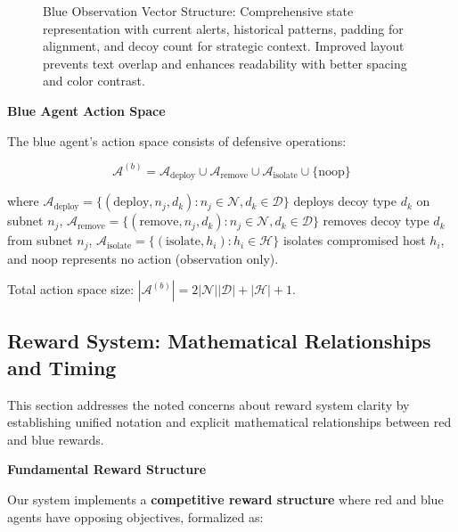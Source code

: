 \documentclass[12pt,oneside]{article}
\begin{document}
\begin{figure}[htbp]
\caption{Blue Observation Vector Structure: Comprehensive state representation with current alerts, historical patterns, padding for alignment, and decoy count for strategic context. Improved layout prevents text overlap and enhances readability with better spacing and color contrast.}
\label{fig:observation_vector}
\end{figure}

\textbf{Blue Agent Action Space}

The blue agent's action space consists of defensive operations:

\begin{equation}
\mathcal{A}^{(b)} = \mathcal{A}_{\text{deploy}} \cup \mathcal{A}_{\text{remove}} \cup \mathcal{A}_{\text{isolate}} \cup \{\text{noop}\}
\end{equation}

where $\mathcal{A}_{\text{deploy}} = \{(\text{deploy}, n_j, d_k) : n_j \in \mathcal{N}, d_k \in \mathcal{D}\}$ deploys decoy type $d_k$ on subnet $n_j$, $\mathcal{A}_{\text{remove}} = \{(\text{remove}, n_j, d_k) : n_j \in \mathcal{N}, d_k \in \mathcal{D}\}$ removes decoy type $d_k$ from subnet $n_j$, $\mathcal{A}_{\text{isolate}} = \{(\text{isolate}, h_i) : h_i \in \mathcal{H}\}$ isolates compromised host $h_i$, and $\text{noop}$ represents no action (observation only).

Total action space size: $|\mathcal{A}^{(b)}| = 2|\mathcal{N}||\mathcal{D}| + |\mathcal{H}| + 1$.

\subsection{Reward System: Mathematical Relationships and Timing}

This section addresses the noted concerns about reward system clarity by establishing unified notation and explicit mathematical relationships between red and blue rewards.

\textbf{Fundamental Reward Structure}

Our system implements a \textbf{competitive reward structure} where red and blue agents have opposing objectives, formalized as:
\end{document}

